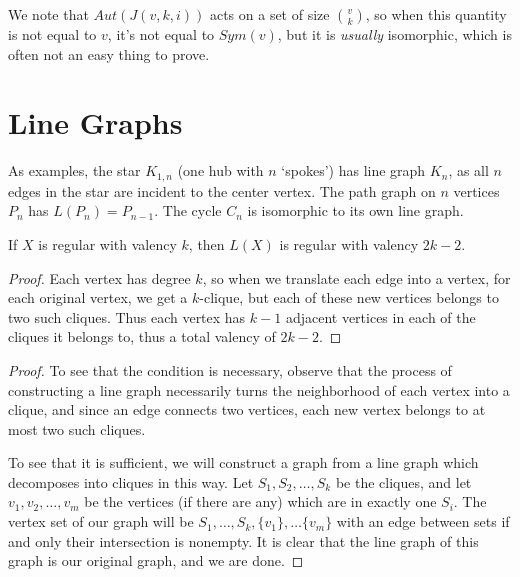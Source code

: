 We note that $Aut(J(v,k,i))$ acts on a set of size $\binom{v}{k}$, so when this quantity is not equal to $v$, it's not equal to $Sym(v)$, but it is \textit{usually} isomorphic, which is often not an easy thing to prove.


\section*{Line Graphs}


As examples, the star $K_{1,n}$ (one hub with $n$ `spokes') has line graph $K_n$, as all $n$ edges in the star are incident to the center vertex.  The path graph on $n$ vertices $P_n$ has $L(P_n)=P_{n-1}$.  The cycle $C_n$ is isomorphic to its own line graph.

\begin{lemma}
{If $X$ is regular with valency $k$, then $L(X)$ is regular with valency $2k-2$.}
\end{lemma}
\begin{proof}
	Each vertex has degree $k$, so when we translate each edge into a vertex, for each original vertex, we get a $k$-clique, but each of these new vertices belongs to two such cliques.  Thus each vertex has $k-1$ adjacent vertices in each of the cliques it belongs to, thus a total valency of $2k-2$.
\end{proof}



\begin{proof}
	
	To see that the condition is necessary, observe that the process of constructing a line graph necessarily turns the neighborhood of each vertex into a clique, and since an edge connects two vertices, each new vertex belongs to at most two such cliques.
	
	To see that it is sufficient, we will construct a graph from a line graph which decomposes into cliques in this way.  Let $S_1,S_2,\dots,S_k$ be the cliques, and let $v_1,v_2,\dots,v_m$ be the vertices (if there are any) which are in exactly one $S_i$.  The vertex set of our graph will be $S_1,\dots,S_k,\{v_1\},\dots \{v_m\}$ with an edge between sets if and only their intersection is nonempty.  It is clear that the line graph of this graph is our original graph, and we are done.
	
\end{proof}

